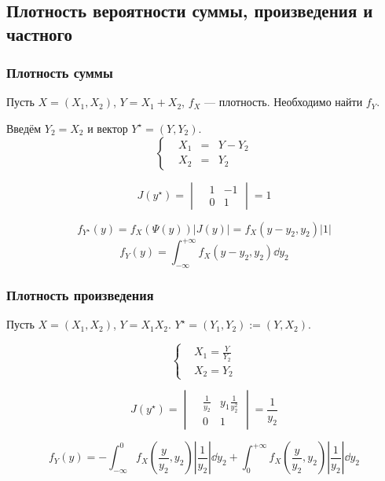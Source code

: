 \subsection{Плотность вероятности суммы, произведения и
частного}\label{ux43fux43bux43eux442ux43dux43eux441ux442ux44c-ux432ux435ux440ux43eux44fux442ux43dux43eux441ux442ux438-ux441ux443ux43cux43cux44b-ux43fux440ux43eux438ux437ux432ux435ux434ux435ux43dux438ux44f-ux438-ux447ux430ux441ux442ux43dux43eux433ux43e}

\subsubsection{Плотность
суммы}\label{ux43fux43bux43eux442ux43dux43eux441ux442ux44c-ux441ux443ux43cux43cux44b}

Пусть \(X = (X_1, X_2)\), \(Y = X_1 + X_2\), \(f_X\) --- плотность.
Необходимо найти \(f_Y\).

Введём \(Y_2 = X_2\) и вектор \(Y^\star = (Y, Y_2)\).
\[\left\{\begin{aligned}
& X_1 &=& Y - Y_2 \\
& X_2 &=& Y_2
\end{aligned}\right.\]

\[ J(y^\star) =
\begin{vmatrix}
& 1 & -1 \\
& 0 & 1
\end{vmatrix} = 1\]

\[f_{Y^\star}(y) = f_X(\Psi(y)) |J(y)| = f_X (y - y_2, y_2) |1|\]
\[f_Y(y) = \int_{-\infty}^{+\infty} f_X(y - y_2, y_2) \dd y_2\]

\subsubsection{Плотность
произведения}\label{ux43fux43bux43eux442ux43dux43eux441ux442ux44c-ux43fux440ux43eux438ux437ux432ux435ux434ux435ux43dux438ux44f}

Пусть \(X=(X_1,X_2)\), \(Y = X_1 X_2\).
\(Y^\star = (Y_1, Y_2) := (Y, X_2)\).

\[\left\{\begin{aligned}
& X_1 = \frac{Y}{Y_2}\\
& X_2 = Y_2
\end{aligned}\right.\]

\[J(y^\star) =
\begin{vmatrix}
& \frac{1}{y_2} & y_1 \frac{1}{y_2^2} \\
& 0             & 1
\end{vmatrix} = \frac{1}{y_2}\]

\[f_Y(y) = - \int_{-\infty}^0 f_X(\frac{y}{y_2}, y_2) \left|\frac{1}{y_2}\right| \dd y_2
           + \int_0^{+\infty} f_X(\frac{y}{y_2}, y_2) \left|\frac{1}{y_2}\right| \dd y_2\]
